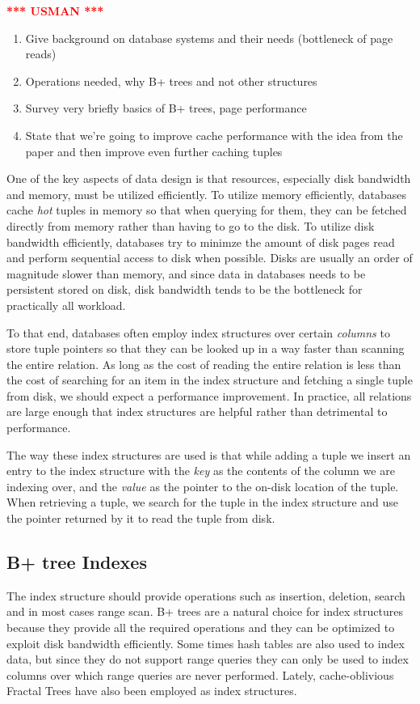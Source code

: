 \documentclass{article}
\newcommand{\usman}{\textcolor{Red}{\textbf{*** USMAN ***} }}
\begin{document}
\usman
\begin{enumerate}
	\item Give background on database systems and their needs (bottleneck of page reads)
	\item Operations needed, why B+ trees and not other structures
	\item Survey very briefly basics of B+ trees, page performance
	\item State that we're going to improve cache performance with the idea from the paper and then improve even further
caching tuples
\end{enumerate}

One of the key aspects of data design is that resources, especially disk bandwidth and memory, must be utilized efficiently. To utilize memory efficiently, databases cache \textit{hot} tuples in memory so that when querying for them, they can be fetched directly from memory rather than having to go to the disk. To utilize disk bandwidth efficiently, databases try to minimze the amount of disk pages read and perform sequential access to disk when possible. Disks are usually an order of magnitude slower than memory, and since data in databases needs to be persistent stored on disk, disk bandwidth tends to be the bottleneck for practically all workload.

To that end, databases often employ index structures over certain \textit{columns} to store tuple pointers so that they can be looked up in a way faster than scanning the entire relation. As long as the cost of reading the entire relation is less than the cost of searching for an item in the index structure and fetching a single tuple from disk, we should expect a performance improvement. In practice, all relations are large enough that index structures are helpful rather than detrimental to performance.

The way these index structures are used is that while adding a tuple we insert an entry to the index structure with the \textit{key} as the contents of the column we are indexing over, and the \textit{value} as the pointer to the on-disk location of the tuple. When retrieving a tuple, we search for the tuple in the index structure and use the pointer returned by it to read the tuple from disk. 

\subsection{B+ tree Indexes}
The index structure should provide operations such as insertion, deletion, search and in most cases range scan. B+ trees are a natural choice for index structures because they provide all the required operations and they can be optimized to exploit disk bandwidth efficiently. Some times hash tables are also used to index data, but since they do not support range queries they can only be used to index columns over which range queries are never performed. Lately, cache-oblivious Fractal Trees have also been employed as index structures.
\end{document}
